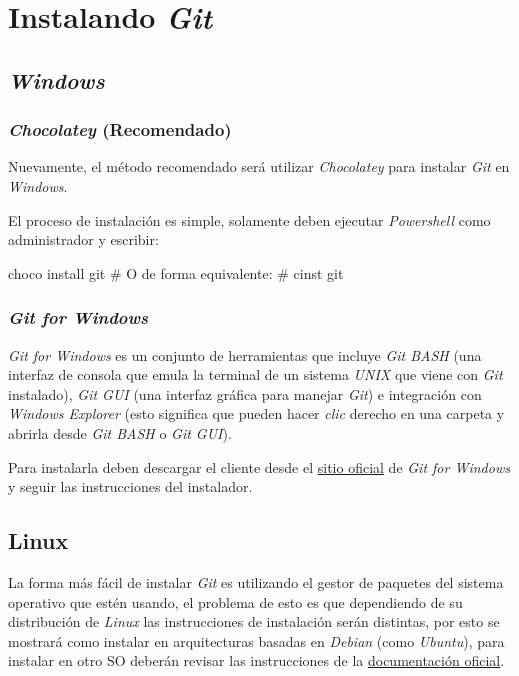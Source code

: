 \section{Instalando \textit{Git}}
 	\subsection{\textit{Windows}}
    \subsubsection{\textit{Chocolatey} (Recomendado)}
      Nuevamente, el método recomendado será utilizar \textit{Chocolatey} para 
      instalar \textit{Git} en \textit{Windows}.
      
      El proceso de instalación es simple, solamente deben ejecutar 
      \textit{Powershell} como administrador y escribir:
      \begin{powershell}
        choco install git 
        # O de forma equivalente:
        # cinst git
      \end{powershell}
    
    \subsubsection{\textit{Git for Windows}}
      \textit{Git for Windows} es un conjunto de herramientas que incluye \textit{Git 
      BASH} (una interfaz de consola que emula la terminal de un sistema \textit{UNIX} 
      que viene con \textit{Git} instalado), \textit{Git GUI} (una interfaz gráfica para 
      manejar \textit{Git}) e integración con \textit{Windows Explorer} (esto significa 
      que pueden hacer \textit{clic} derecho en una carpeta y abrirla desde \textit{Git 
      BASH} o \textit{Git GUI}).
      
      Para instalarla deben descargar el cliente desde el 
      \href{https://gitforwindows.org}{sitio oficial} de \textit{Git for Windows} y 
      seguir las instrucciones del instalador.

  \subsection{Linux}
    La forma más fácil de instalar \textit{Git} es utilizando el gestor de paquetes del
    sistema operativo que estén usando, el problema de esto es que dependiendo de su distribución
    de \textit{Linux} las instrucciones de instalación serán distintas, por esto se 
    mostrará como instalar en arquitecturas basadas en \textit{Debian} (como \textit{Ubuntu}), para 
    instalar en otro SO deberán revisar las instrucciones de la 
    \href{https://git-scm.com/download/linux}{documentación oficial}.

